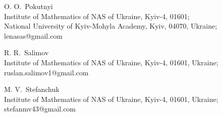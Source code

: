 \documentclass[amstex,16pt, amssymb]{article}
\theoremstyle{plain}
\theoremstyle{definition}
\numberwithin{equation}{section}
\numberwithin{equation}{section}
\begin{document}
O. O.~Pokutnyi \\Institute of Mathematics of NAS of Ukraine,
        Kyiv-4, 01601;\\National University of Kyiv-Mohyla Academy,
        Kyiv, 04070, Ukraine;\\lenasas@gmail.com

\medskip

R. R.~Salimov\\Institute of Mathematics of NAS of Ukraine,
        Kyiv-4, 01601, Ukraine;\\ruslan.salimov1@gmail.com

\medskip
M. V.~Stefanchuk\\Institute of Mathematics of NAS of Ukraine,
         Kyiv-4, 01601, Ukraine;\\stefanmv43@gmail.com
\end{document}
